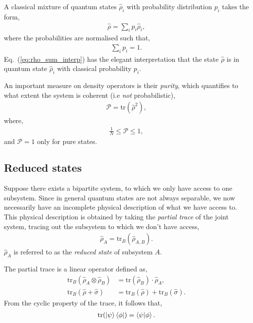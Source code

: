 \documentclass[aps,pra,twocolumn,amsmath,amssymb,nofootinbib,superscriptaddress]{revtex4}
\begin{document}
A classical mixture of quantum states $\hat\rho_i$ with probability distribution $p_i$ takes the form,
\begin{align}\label{eq:rho_sum_interp}
	\hat\rho = \sum_i p_i \hat\rho_i,
\end{align}
where the probabilities are normalised such that,
\begin{align}
	\sum_i p_i = 1.
\end{align}
Eq.~(\ref{eq:rho_sum_interp}) has the elegant interpretation that the state $\hat\rho$ is in quantum state $\hat\rho_i$ with classical probability $p_i$.

An important measure on density operators is their \textit{purity}, which quantifies to what extent the system is coherent (i.e \textit{not} probabilistic),
\begin{align}
\mathcal{P} = \mathrm{tr}(\hat\rho^2),
\end{align}
where,
\begin{align}
\frac{1}{N}\leq \mathcal{P}\leq 1,	
\end{align}
and \mbox{$\mathcal{P}=1$} only for pure states.

%
%

\subsection{Reduced states}

Suppose there exists a bipartite system, to which we only have access to one subsystem. Since in general quantum states are not always separable, we now necessarily have an incomplete physical description of what we have access to. This physical description is obtained by taking the \textit{partial trace} of the joint system, tracing out the subsystem to which we don't have access,
\begin{align}
\hat\rho_A = \mathrm{tr}_B(\hat\rho_{A,B}).	
\end{align}
$\hat\rho_A$ is referred to as the \textit{reduced state} of subsystem $A$.

The partial trace is a linear operator defined as,
\begin{align}
\mathrm{tr}_B(\hat\rho_A\otimes\hat\rho_B) &= \mathrm{tr}(\hat\rho_B) \cdot \hat\rho_A,\nonumber\\
\mathrm{tr}_B(\hat\rho+\hat\sigma) &= \mathrm{tr}_B(\hat\rho) + \mathrm{tr}_B(\hat\sigma).
\end{align}
From the cyclic property of the trace, it follows that,
\begin{align}
\mathrm{tr}(\ket\psi\bra\phi) = \braket{\psi|\phi}.	
\end{align}
\end{document}
